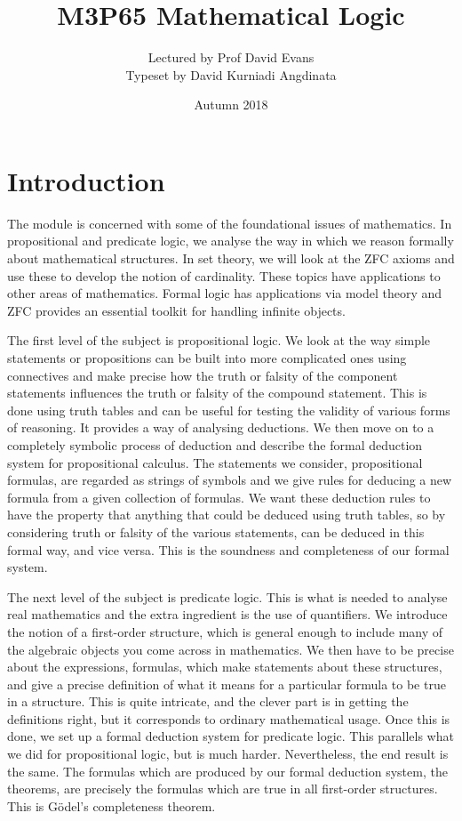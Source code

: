 \documentclass{article}
\title{M3P65 Mathematical Logic}
\author{Lectured by Prof David Evans \\ Typeset by David Kurniadi Angdinata}
\date{Autumn 2018}
\theoremstyle{definition}\newtheorem{definition}{Definition}[subsection]
\theoremstyle{definition}\newtheorem{remark1}[definition]{Remark}
\theoremstyle{definition}\newtheorem{example1}[definition]{Example}
\theoremstyle{definition}\newtheorem*{remark2}{Remark}
\theoremstyle{definition}\newtheorem*{example2}{Example}
\theoremstyle{definition}\newtheorem*{note}{Note}
\theoremstyle{definition}\newtheorem*{notation}{Notation}
\begin{document}
\maketitle

\vfill

\tableofcontents

\pagebreak

\section{Introduction}


The module is concerned with some of the foundational issues of mathematics. In propositional and predicate logic, we analyse the way in which we reason formally about mathematical structures. In set theory, we will look at the ZFC axioms and use these to develop the notion of cardinality. These topics have applications to other areas of mathematics. Formal logic has applications via model theory and ZFC provides an essential toolkit for handling infinite objects.

The first level of the subject is propositional logic. We look at the way simple statements or propositions can be built into more complicated ones using connectives and make precise how the truth or falsity of the component statements influences the truth or falsity of the compound statement. This is done using truth tables and can be useful for testing the validity of various forms of reasoning. It provides a way of analysing deductions. We then move on to a completely symbolic process of deduction and describe the formal deduction system for propositional calculus. The statements we consider, propositional formulas, are regarded as strings of symbols and we give rules for deducing a new formula from a given collection of formulas. We want these deduction rules to have the property that anything that could be deduced using truth tables, so by considering truth or falsity of the various statements, can be deduced in this formal way, and vice versa. This is the soundness and completeness of our formal system.

The next level of the subject is predicate logic. This is what is needed to analyse real mathematics and the extra ingredient is the use of quantifiers. We introduce the notion of a first-order structure, which is general enough to include many of the algebraic objects you come across in mathematics. We then have to be precise about the expressions, formulas, which make statements about these structures, and give a precise definition of what it means for a particular formula to be true in a structure. This is quite intricate, and the clever part is in getting the definitions right, but it corresponds to ordinary mathematical usage. Once this is done, we set up a formal deduction system for predicate logic. This parallels what we did for propositional logic, but is much harder. Nevertheless, the end result is the same. The formulas which are produced by our formal deduction system, the theorems, are precisely the formulas which are true in all first-order structures. This is G\"odel's completeness theorem.
\end{document}
